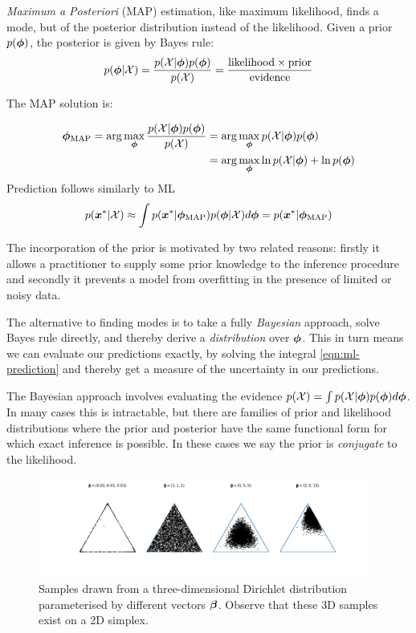 \emph{Maximum a Posteriori} (MAP) estimation, like maximum likelihood, finds a mode, but of the posterior distribution instead of the likelihood. Given a prior $p({ \bm \phi })$, the posterior is given by Bayes rule:
\begin{align}
p({ \bm \phi } | { \mathcal{X} }) = \frac{p({ \mathcal{X} } | { \bm \phi })p({ \bm \phi })}{p({ \mathcal{X} })} = \frac{\text{likelihood} \times \text{prior}}{\text{evidence}}
\end{align}

The MAP solution is:

\begin{align}
{ { {  \bm \phi  } }_{\text{MAP}} } = \arg \max_{{ \bm \phi }} \frac{p({ \mathcal{X} } | { \bm \phi })p({ \bm \phi })}{p({ \mathcal{X} })}
 & = \arg \max_{{ \bm \phi }} p({ \mathcal{X} } | { \bm \phi })p({ \bm \phi }) \\
 & = \arg \max_{ \bm \phi } \ln p({ \mathcal{X} } | { \bm \phi }) + \ln p({ \bm \phi })
\end{align}
Prediction follows similarly to ML
\begin{align}
p({ \bm x^{*} } | { \mathcal{X} }) \approx \int p({ \bm x^{*} } | { {{ \bm \phi }}_{\text{MAP}} })p({ \bm \phi }|{ \mathcal{X} })d{ \bm \phi } = p({ \bm x^{*} } | { {{ \bm \phi }}_{\text{MAP}} })
\end{align}



The incorporation of the prior is motivated by two related reasons: firstly it allows a practitioner to supply some prior knowledge to the inference procedure and secondly it prevents a model from overfitting in the presence of limited or noisy data.

The alternative to finding modes is to take a fully \emph{Bayesian} approach, solve Bayes rule directly, and thereby derive a \emph{distribution} over ${ \bm \phi }$. This in turn means we can evaluate our predictions exactly, by solving the integral \eqref{eqn:ml-prediction} and thereby get a measure of the uncertainty in our predictions.

The Bayesian approach involves evaluating the evidence $p({ \mathcal{X} }) = \int p({ \mathcal{X} } | { \bm \phi }) p({ \bm \phi }) d{ \bm \phi }$. In many cases this is intractable, but there are families of prior and likelihood distributions where the prior and posterior have the same functional form for which exact inference is possible. In these cases we say the prior is \emph{conjugate} to the likelihood.

\begin{figure}
  \centering
    \includegraphics[width=0.97\textwidth]{./Chap1/plots/dirichlet_samples.pdf}
  \caption{Samples drawn from a three-dimensional Dirichlet distribution parameterised by different vectors $\bm \beta$. Observe that these 3D samples exist on a 2D simplex.}
  \label{fig:dirichlet-params}
\end{figure}

